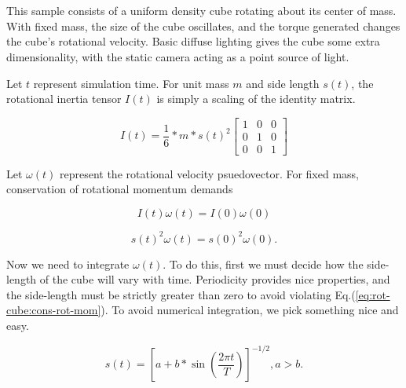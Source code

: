 \documentclass[a4paper,12pt]{book}
\begin{document}
\chapter*{}

This sample consists of a uniform density cube rotating about its center of mass. With fixed mass, the size of the cube oscillates, and the torque generated changes the cube's rotational velocity. Basic diffuse lighting gives the cube some extra dimensionality, with the static camera acting as a point source of light. 

Let $t$ represent simulation time.
For unit mass $m$ and side length $s(t)$, the rotational inertia tensor $I(t)$ is simply a scaling of the identity matrix.

\begin{equation*}
I(t) = \frac{1}{6} * m * s(t)^2
\begin{bmatrix}
1 & 0 & 0 \\
0 & 1 & 0 \\
0 & 0 & 1
\end{bmatrix}
\end{equation*}

Let $\omega(t)$ represent the rotational velocity psuedovector. For fixed mass, conservation of rotational momentum demands

\begin{equation*}
I(t) \omega(t) = I(0) \omega(0)
\end{equation*}

\begin{equation}\label{eq:rot-cube:cons-rot-mom}
s(t)^2 \omega(t) = s(0)^2 \omega(0).
\end{equation}

Now we need to integrate $\omega(t)$. To do this, first we must decide how the side-length of the cube will vary with time. Periodicity provides nice properties, and the side-length must be strictly greater than zero to avoid violating Eq.(\ref{eq:rot-cube:cons-rot-mom}). To avoid numerical integration, we pick something nice and easy.

\begin{equation}\label{eq:rot-cube:side}
s(t) = \left[ a + b * \sin\left(\frac{2 \pi t}{T}\right) \right]^{-1/2}, a > b.
\end{equation}
\end{document}
